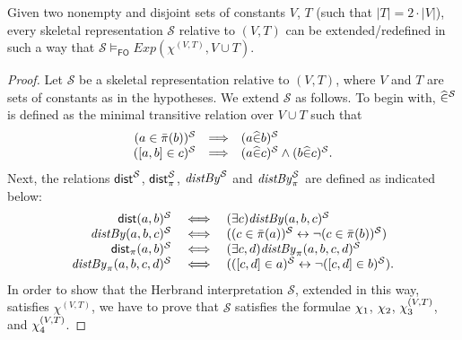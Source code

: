 \documentclass[manyauthors]{fundam}
\newcommand{\HExp}{Exp}
\newcommand{\pair}[2]{[#1,#2]}
\newcommand{\pairin}[3]{\left[#1,#2\right] \in #3}
\newcommand{\nonpairin}[2]{#1 \in \bar{\pi}(#2)}
\newcommand{\seteq}[2]{#1=#2}
\newcommand{\atset}{\mathcal{S}}
\newcommand{\consta}{a}
\newcommand{\constb}{b}
\newcommand{\constc}{c}
\newcommand{\constd}{d}
\newcommand{\hinter}{\ensuremath{\mathcal{H}}}
\newcommand{\fomodels}[2]{#1 \models_{\mathsf{FO}} #2}
\begin{document}
\begin{lemma}\label{SKTOHER}
Given two nonempty and disjoint sets of constants $V$, $T$ (such that 
$|T| = 2 \cdot |V|$), every skeletal representation $\atset$ relative 
to $(V,T)$
can be extended/redefined in such a way that $ 
\fomodels{\atset}{\HExp(\chi^{(V,T)}, V \cup T)}$.
\end{lemma}
\begin{proof}
Let $\atset$ be a skeletal representation relative to $(V,T)$, where
$V$ and $T$ are sets of constants as in the hypotheses. We extend 
$\atset$ as follows.
%
%
To begin with, $\memhatP{}^{\atset}$ is defined as the minimal 
transitive relation over $V \cup T$
such that
\[
\begin{array}{rcl}
  (\nonpairin{\consta}{\constb})^{\atset} & \Longrightarrow & 
(\memhat{\consta}{\constb})^{\atset} \\
  (\pairin{\consta}{\constb}{\constc})^{\atset} & \Longrightarrow & 
(\memhat{\consta}{\constc})^{\atset} \wedge 
(\memhat{\constb}{\constc})^{\atset}.
\end{array}
\]
Next, the relations $\distS^{\atset}$, $\distPS^{\atset}$, 
$\distbyS^{\atset}$ and $\distPbyS^{\atset}$ are defined
as indicated below:
\[
\begin{array}{rcl}
   \dist{\consta}{\constb}^{\atset} & \iff & (\exists 
\constc)\distby{\consta}{\constb}{\constc}^{\atset}\\
   \distby{\consta}{\constb}{\constc}^{\atset} & \iff & 
((\nonpairin{\constc}{\consta})^{\atset} \leftrightarrow \neg 
(\nonpairin{\constc}{\constb})^{\atset}) \\
   \distP{\consta}{\constb}^{\atset} & \iff & (\exists \constc, 
\constd)\distPby{\consta}{\constb}{\constc}{\constd}^{\atset} \\
   \distPby{\consta}{\constb}{\constc}{\constd}^{\atset} & \iff & 
((\pairin{\constc}{\constd}{\consta})^{\atset} \leftrightarrow \neg 
(\pairin{\constc}{\constd}{\constb})^{\atset}) .
\end{array}
\]
%
%
In order to show that the Herbrand interpretation $\atset$, extended
in this way, satisfies $\chi^{(V,T)}$, we have to prove that $\atset$
satisfies the formulae $\chi_1$, $\chi_2$, $\chi_3^{(V,T)}$, and
$\chi_4^{(V,T)}$.


\end{proof}
\end{document}
